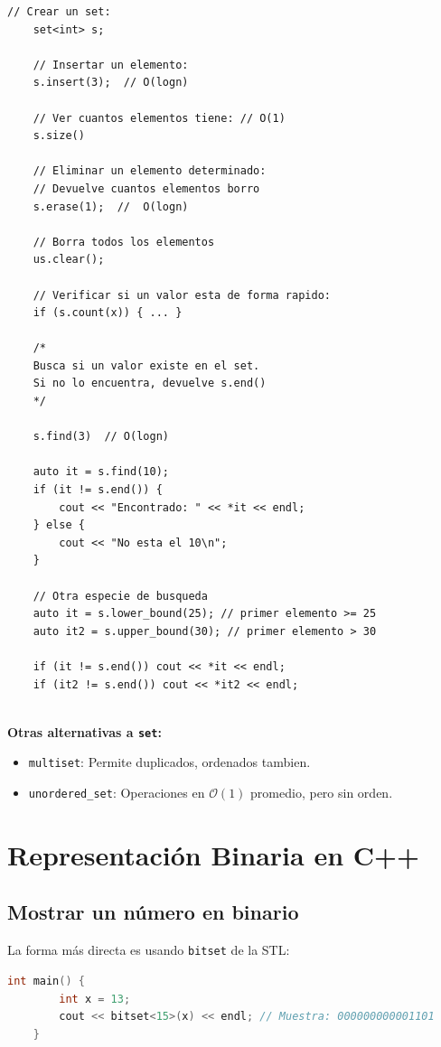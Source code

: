 \begin{lstlisting}[style=cppstyle, caption={Funcionamiento del stack}]
	// Crear un set:
	set<int> s;
	
	// Insertar un elemento:
	s.insert(3);  // O(logn)
	
	// Ver cuantos elementos tiene: // O(1)
	s.size()
	
	// Eliminar un elemento determinado: 
	// Devuelve cuantos elementos borro
	s.erase(1);  //  O(logn)
	
	// Borra todos los elementos
	us.clear();
	
	// Verificar si un valor esta de forma rapido: 
	if (s.count(x)) { ... }
	
	/* 
	Busca si un valor existe en el set.
	Si no lo encuentra, devuelve s.end()
	*/
	
	s.find(3)  // O(logn)
	
	auto it = s.find(10);
	if (it != s.end()) {
		cout << "Encontrado: " << *it << endl;
	} else {
		cout << "No esta el 10\n";
	}
	
	// Otra especie de busqueda
	auto it = s.lower_bound(25); // primer elemento >= 25
	auto it2 = s.upper_bound(30); // primer elemento > 30
	
	if (it != s.end()) cout << *it << endl;
	if (it2 != s.end()) cout << *it2 << endl;
	
\end{lstlisting}

\textbf{Otras alternativas a \texttt{set}:}
\begin{itemize}
	\item \texttt{multiset}: Permite duplicados, ordenados tambien.
	\item \texttt{unordered\_set}: Operaciones en $\mathcal{O}(1)$ promedio, pero sin orden.
\end{itemize}

\section{Representación Binaria en C++}
\subsection{Mostrar un número en binario}

La forma más directa es usando \texttt{bitset} de la STL:

\begin{lstlisting}[language=C++, caption=Muestra un número en binario con 15 bits]
	int main() {
		int x = 13;
		cout << bitset<15>(x) << endl; // Muestra: 000000000001101
	}
\end{lstlisting}

